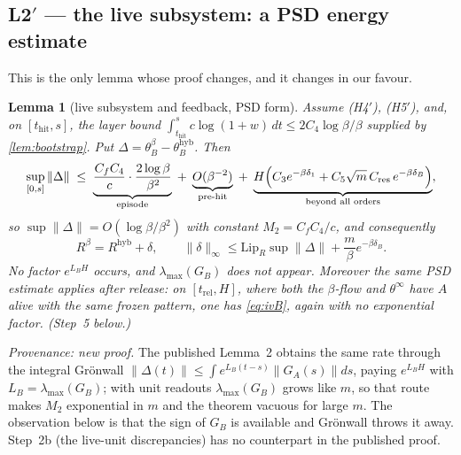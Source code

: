 \documentclass[11pt]{article}
\newtheorem{lemma}{Lemma}
\theoremstyle{definition}
\theoremstyle{remark}
\newcommand{\hyb}{\mathrm{hyb}}
\newcommand{\thit}{t_{\mathrm{hit}}}
\newcommand{\trel}{t_{\mathrm{rel}}}
\begin{document}
\subsection*{L2$'$ --- the live subsystem: a PSD energy estimate}

This is the only lemma whose proof changes, and it changes in our favour.

\begin{lemma}[live subsystem and feedback, PSD form]\label{lem:gronwall}
Assume \textup{(H4$'$)}, \textup{(H5$'$)}, and, on $[\thit,s]$, the layer bound
$\int_{\thit}^{s}c\log(1+w)\,dt\le 2C_4\log\beta/\beta$ supplied by
\cref{lem:bootstrap}. Put $\Delta=\theta_B^\beta-\theta_B^{\hyb}$. Then
\begin{equation}\label{eq:Brate}
\sup_{[0,s]}\|\Delta\|
\;\le\;\underbrace{\frac{C_fC_4}{c}\cdot\frac{2\log\beta}{\beta^2}}_{\text{episode}}
\;+\;\underbrace{O(\beta^{-2})}_{\text{pre-hit}}
\;+\;\underbrace{H\Bigl(C_3e^{-\beta\delta_1}+C_5\sqrt m\,C_{\mathrm{res}}\,e^{-\beta\delta_B}\Bigr)}_{\text{beyond all orders}} ,
\end{equation}
so $\sup\|\Delta\|=O(\log\beta/\beta^2)$ with constant $M_2=C_fC_4/c$, and
consequently
\begin{equation}\label{eq:Rpert}
R^\beta=R^{\hyb}+\delta,\qquad
\|\delta\|_\infty\le\mathrm{Lip}_R\sup\|\Delta\|
+\frac{m}{\beta}e^{-\beta\delta_B} .
\end{equation}
\emph{No factor $e^{L_BH}$ occurs, and $\lambda_{\max}(G_B)$ does not appear.}
Moreover the same PSD estimate applies after release: on $[\trel,H]$, where both
the $\beta$-flow and $\theta^\infty$ have $A$ alive with the same frozen pattern,
one has \eqref{eq:ivB}, again with no exponential factor. (Step~5 below.)
\end{lemma}

\noindent\emph{Provenance: new proof.} The published Lemma~2 obtains the same
rate through the integral Gr\"onwall
$\|\Delta(t)\|\le\int e^{L_B(t-s)}\|G_A(s)\|ds$, paying $e^{L_BH}$ with
$L_B=\lambda_{\max}(G_B)$; with unit readouts $\lambda_{\max}(G_B)$ grows like
$m$, so that route makes $M_2$ exponential in $m$ and the theorem vacuous for
large $m$. The observation below is that the sign of $G_B$ is available and
Gr\"onwall throws it away. Step~2b (the live-unit discrepancies) has no
counterpart in the published proof.
\end{document}
